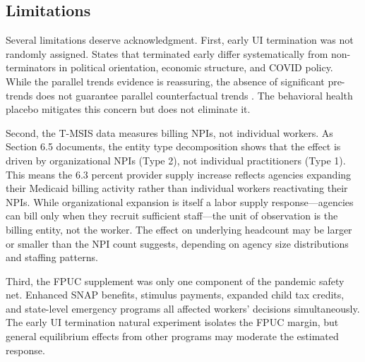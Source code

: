 \documentclass[12pt]{article}
\begin{document}
\subsection{Limitations}

Several limitations deserve acknowledgment. First, early UI termination was not randomly assigned. States that terminated early differ systematically from non-terminators in political orientation, economic structure, and COVID policy. While the parallel trends evidence is reassuring, the absence of significant pre-trends does not guarantee parallel counterfactual trends \citep{roth2022}. The behavioral health placebo mitigates this concern but does not eliminate it.

Second, the T-MSIS data measures billing NPIs, not individual workers. As Section 6.5 documents, the entity type decomposition shows that the effect is driven by organizational NPIs (Type 2), not individual practitioners (Type 1). This means the 6.3 percent provider supply increase reflects agencies expanding their Medicaid billing activity rather than individual workers reactivating their NPIs. While organizational expansion is itself a labor supply response---agencies can bill only when they recruit sufficient staff---the unit of observation is the billing entity, not the worker. The effect on underlying headcount may be larger or smaller than the NPI count suggests, depending on agency size distributions and staffing patterns.

Third, the FPUC supplement was only one component of the pandemic safety net. Enhanced SNAP benefits, stimulus payments, expanded child tax credits, and state-level emergency programs all affected workers' decisions simultaneously. The early UI termination natural experiment isolates the FPUC margin, but general equilibrium effects from other programs may moderate the estimated response.
\end{document}
